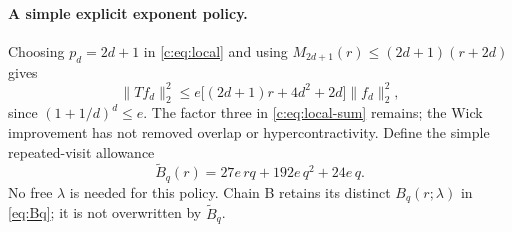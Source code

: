 \documentclass[11pt]{article}
\numberwithin{equation}{section}
\theoremstyle{definition}\newtheorem{definition}[theorem]{Definition}
\theoremstyle{remark}\newtheorem{remark}[theorem]{Remark}
\newcommand{\norm}[1]{\lVert#1\rVert}\newcommand{\ip}[2]{\langle#1,#2\rangle}
\begin{document}
\paragraph{A simple explicit exponent policy.}
Choosing $p_d=2d+1$ in \eqref{c:eq:local} and using
$M_{2d+1}(r)\le(2d+1)(r+2d)$ gives
\begin{equation}\label{c:eq:local-simple}
 \norm{Tf_d}_2^2\le
 e\bigl[(2d+1)r+4d^2+2d\bigr]\norm{f_d}_2^2,
\end{equation}
since $(1+1/d)^d\le e$. The factor three in \eqref{c:eq:local-sum}
remains; the Wick improvement has not removed overlap or hypercontractivity.
Define the simple repeated-visit allowance
\begin{equation}\label{c:eq:Bq}
 \boxed{\widetilde B_q(r)=27e\,rq+192e\,q^2+24e\,q.}
\end{equation}
No free $\lambda$ is needed for this policy. Chain B retains its distinct $B_q(r;\lambda)$ in \eqref{eq:Bq};
it is not overwritten by $\widetilde B_q$.
\end{document}
